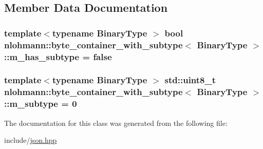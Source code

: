 \subsection{Member Data Documentation}
\subsubsection[{\texorpdfstring{m\+\_\+has\+\_\+subtype}{m_has_subtype}}]{\setlength{\rightskip}{0pt plus 5cm}template$<$typename Binary\+Type $>$ bool {\bf nlohmann\+::byte\+\_\+container\+\_\+with\+\_\+subtype}$<$ Binary\+Type $>$\+::m\+\_\+has\+\_\+subtype = false\hspace{0.3cm}{\ttfamily [private]}}\hypertarget{classnlohmann_1_1byte__container__with__subtype_a69aa7a914a7a31b61d3a9567d74ddf7b}{}\label{classnlohmann_1_1byte__container__with__subtype_a69aa7a914a7a31b61d3a9567d74ddf7b}
\subsubsection[{\texorpdfstring{m\+\_\+subtype}{m_subtype}}]{\setlength{\rightskip}{0pt plus 5cm}template$<$typename Binary\+Type $>$ std\+::uint8\+\_\+t {\bf nlohmann\+::byte\+\_\+container\+\_\+with\+\_\+subtype}$<$ Binary\+Type $>$\+::m\+\_\+subtype = 0\hspace{0.3cm}{\ttfamily [private]}}\hypertarget{classnlohmann_1_1byte__container__with__subtype_ae36c8f29f4f50a00962b0e9110ba2756}{}\label{classnlohmann_1_1byte__container__with__subtype_ae36c8f29f4f50a00962b0e9110ba2756}


The documentation for this class was generated from the following file\+:\begin{DoxyCompactItemize}
\item 
include/\hyperlink{json_8hpp}{json.\+hpp}\end{DoxyCompactItemize}
